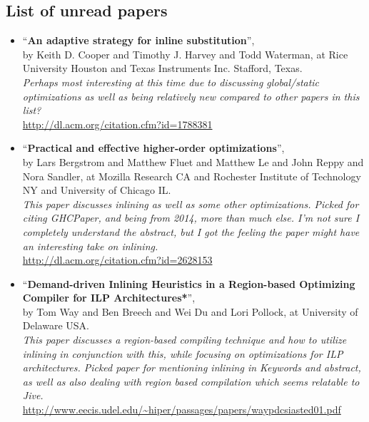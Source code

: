 \subsection{List of unread papers}

\begin{itemize}


	\item ``\textbf{An adaptive strategy for inline substitution}'', \\ by Keith
D. Cooper and Timothy J. Harvey and Todd Waterman, at Rice University Houston
and Texas Instruments Inc. Stafford, Texas. \\
\textit{Perhaps most interesting at this time due to discussing global/static
optimizations as well as being relatively new compared to other papers in this
list?}\\
\url{http://dl.acm.org/citation.cfm?id=1788381}

	\item ``\textbf{Practical and effective higher-order optimizations}'', \\ by
Lars Bergstrom and Matthew Fluet and Matthew Le and John Reppy and Nora Sandler,
at Mozilla Research CA and Rochester Institute of Technology NY and University
of Chicago IL. \\
\textit{This paper discusses inlining as well as some other optimizations.
Picked for citing GHCPaper, and being from 2014, more than much else.
I'm not sure I completely understand the abstract, but I got the feeling the
paper might have an interesting take on inlining.} \\
\url{http://dl.acm.org/citation.cfm?id=2628153}

	\item ``\textbf{Demand-driven Inlining Heuristics in a Region-based
Optimizing Compiler for ILP Architectures*}'', \\ by Tom Way and Ben Breech and
Wei Du and Lori Pollock, at University of Delaware USA. \\
\textit{This paper discusses a region-based compiling technique and how to
utilize inlining in conjunction with this, while focusing on optimizations for
ILP architectures. Picked paper for mentioning inlining in Keywords and
abstract, as well as also dealing with region based compilation which seems
relatable to Jive.} \\
\url{http://www.eecis.udel.edu/~hiper/passages/papers/waypdcsiasted01.pdf}

\end{itemize}

